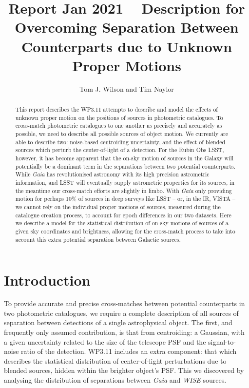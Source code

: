 \documentclass[fleqn,usenatbib]{mnras}
\title[]{Report Jan 2021 – Description for Overcoming Separation Between Counterparts due to Unknown Proper Motions}
\author[Tom J. Wilson and Tim Naylor]{
Tom J. Wilson
and Tim Naylor
\\
}
\date{}
\begin{document}
\label{firstpage}
\pagerange{\pageref{firstpage}--\pageref{lastpage}}
\maketitle
\begin{abstract}
This report describes the WP3.11 attempts to describe and model the effects of unknown proper motion on the positions of sources in photometric catalogues.
To cross-match photometric catalogues to one another as precisely and accurately as possible, we need to describe all possible sources of object motion.
We currently are able to describe two: noise-based centroiding uncertainty, and the effect of blended sources which perturb the center-of-light of a detection.
For the Rubin Obs LSST, however, it has become apparent that the on-sky motion of sources in the Galaxy will potentially be a dominant term in the separations between two potential counterparts.
While \textit{Gaia} has revolutionised astronomy with its high precision astrometric information, and LSST will eventually supply astrometric properties for its sources, in the meantime our cross-match efforts are slightly in limbo.
With \textit{Gaia} only providing motion for perhaps 10\% of sources in deep surveys like LSST -- or, in the IR, VISTA -- we cannot rely on the individual proper motions of sources, measured during the catalogue creation process, to account for epoch differences in our two datasets.
Here we describe a model for the statistical distribution of on-sky motions of sources of a given sky coordinates and brightness, allowing for the cross-match process to take into account this extra potential separation between Galactic sources.
\end{abstract}

\section{Introduction}

To provide accurate and precise cross-matches between potential counterparts in two photometric catalogues, we require a complete description of all sources of separation between detections of a single astrophysical object.
The first, and frequently only assumed contribution, is that from centroiding: a Gaussian, with a given uncertainty related to the size of the telescope PSF and the signal-to-noise ratio of the detection.
WP3.11 includes an extra component: that which describes the statistical distribution of center-of-light perturbations due to blended sources, hidden within the brighter object's PSF.
This we discovered by analysing the distribution of separations between \textit{Gaia} and \textit{WISE} sources.
\end{document}
